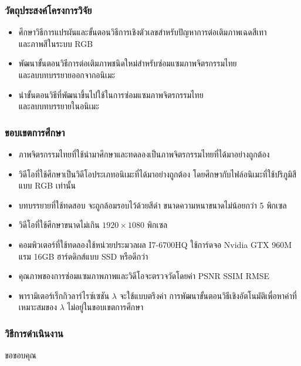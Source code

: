 \documentclass[xcolor=dvipsnames, xetex,serif]{beamer}
\numberwithin{equation}{section}
\begin{document}
		\begin{frame}
			\frametitle{วัตถุประสงค์โครงการวิจัย}
			\begin{itemize}
				\item ศึกษาวิธีการแปรผันและขั้นตอนวิธีการเชิงตัวเลขสำหรับปัญหาการต่อเติมภาพเฉดสีเทา\\และภาพสีในระบบ RGB
				\item พัฒนาขั้นตอนวิธีการต่อเติมภาพชนิดใหม่สำหรับซ่อมแซมภาพจิตรกรรมไทย\\และลบบทบรรยายออกจากอนิเมะ
				\item นำขั้นตอนวิธีที่พัฒนาขึ้นไปใช้ในการซ่อมแซมภาพจิตรกรรมไทย\\และลบบทบรรยายในอนิเมะ
			\end{itemize}
		\end{frame}
		\begin{frame}
			\frametitle{ขอบเขตการศึกษา}
			\begin{itemize}
				\item ภาพจิตรกรรมไทยที่ใช้นำมาศึกษาและทดลองเป็นภาพจิตรกรรมไทยที่ได้มาอย่างถูกต้อง
				\item วิดีโอที่ใช้ศึกษาเป็นวิดีโอประเภทอนิเมะที่ได้มาอย่างถูกต้อง โดยศึกษากับไฟล์อนิเมะที่ใช้ปริภูมิสีแบบ RGB เท่านั้น
				\item บทบรรยายที่ใช้ทดสอบ จะถูกล้อมรอบไว้ด้วยสีดำ ขนาดความหนาขนาดไม่น้อยกว่า 5 พิกเซล
				\item วิดีโอที่ใช้ศึกษาขนาดไม่เกิน $1920\times1080$ พิกเซล
				\item คอมพิวเตอร์ที่ใช้ทดลองใช้หน่วยประมวลผล I7-6700HQ ใช้การ์ดจอ Nvidia GTX 960M แรม 16GB ฮาร์ดดิกส์แบบ SSD หรือดีกว่า
				\item คุณภาพของการซ่อมแซมภาพภาพและวิดีโอจะตรวจวัดโดยค่า PSNR SSIM RMSE 
				\item พารามิเตอร์เร็กกิวลาร์ไรซ์เซชัน $\lambda$ จะใช้แบบตรึงค่า การพัฒนาขั้นตอนวิธีเชิงอัตโนมัติเพื่อหาค่าที่เหมาะสมของ $\lambda$ ไม่อยู่ในขอบเขตการศึกษา
			\end{itemize}
		\end{frame}
		\begin{frame}
			\frametitle{วิธีการดำเนินงาน}
		\end{frame}
		\begin{frame}
			\centering
			\Large{ขอขอบคุณ}
		\end{frame}
	
\end{document}
